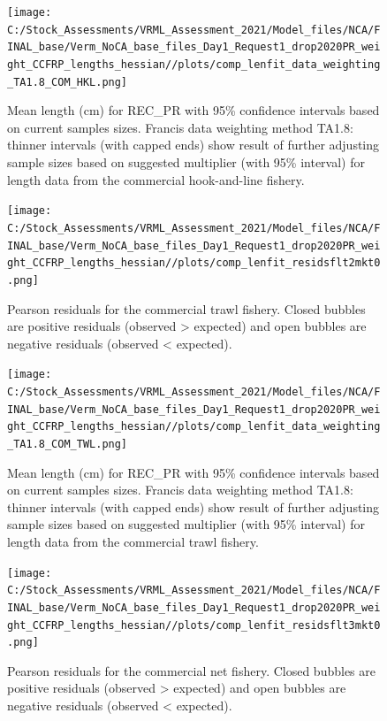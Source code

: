 \documentclass[11pt,
  english,
]{article}
\begin{document}
\begin{figure}
\centering
\texttt{[image: C:/Stock\_Assessments/VRML\_Assessment\_2021/Model\_files/NCA/FINAL\_base/Verm\_NoCA\_base\_files\_Day1\_Request1\_drop2020PR\_weight\_CCFRP\_lengths\_hessian//plots/comp\_lenfit\_data\_weighting\_TA1.8\_COM\_HKL.png]}
\caption{Mean length (cm) for REC\_PR with 95\% confidence intervals based on current samples sizes. Francis data weighting method TA1.8: thinner intervals (with capped ends) show result of further adjusting sample sizes based on suggested multiplier (with 95\% interval) for length data from the commercial hook-and-line fishery.\label{fig:mean-len-fit-COM-HKL}}
\end{figure}

\begin{figure}
\centering
\texttt{[image: C:/Stock\_Assessments/VRML\_Assessment\_2021/Model\_files/NCA/FINAL\_base/Verm\_NoCA\_base\_files\_Day1\_Request1\_drop2020PR\_weight\_CCFRP\_lengths\_hessian//plots/comp\_lenfit\_residsflt2mkt0.png]}
\caption{Pearson residuals for the commercial trawl fishery. Closed bubbles are positive residuals (observed \textgreater{} expected) and open bubbles are negative residuals (observed \textless{} expected).\label{fig:len-pearson-COM-TWL}}
\end{figure}

\begin{figure}
\centering
\texttt{[image: C:/Stock\_Assessments/VRML\_Assessment\_2021/Model\_files/NCA/FINAL\_base/Verm\_NoCA\_base\_files\_Day1\_Request1\_drop2020PR\_weight\_CCFRP\_lengths\_hessian//plots/comp\_lenfit\_data\_weighting\_TA1.8\_COM\_TWL.png]}
\caption{Mean length (cm) for REC\_PR with 95\% confidence intervals based on current samples sizes. Francis data weighting method TA1.8: thinner intervals (with capped ends) show result of further adjusting sample sizes based on suggested multiplier (with 95\% interval) for length data from the commercial trawl fishery.\label{fig:mean-len-fit-COM-TWL}}
\end{figure}

\begin{figure}
\centering
\texttt{[image: C:/Stock\_Assessments/VRML\_Assessment\_2021/Model\_files/NCA/FINAL\_base/Verm\_NoCA\_base\_files\_Day1\_Request1\_drop2020PR\_weight\_CCFRP\_lengths\_hessian//plots/comp\_lenfit\_residsflt3mkt0.png]}
\caption{Pearson residuals for the commercial net fishery. Closed bubbles are positive residuals (observed \textgreater{} expected) and open bubbles are negative residuals (observed \textless{} expected).\label{fig:len-pearson-COM-NET}}
\end{figure}
\end{document}
